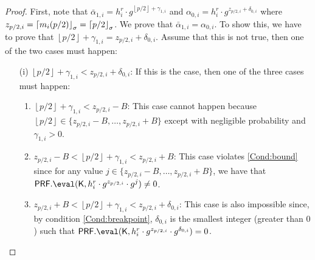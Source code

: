 \begin{proof}

First, note that $\bar \alpha_{1,i}=h_i^r\cdot g^{\left\lfloor p/2\right\rfloor + \gamma_{1,i}}$ and $\alpha_{0,i}=h_i^r\cdot g^{z_{p/2,i}+ \delta_{0,i}} $ where $z_{p/2,i}=\left\lceil m_i(p/2)\right\rfloor_\sigma=\left\lceil p/2 \right\rfloor_{\sigma}$. We prove that $\bar \alpha_{1,i}=\alpha_{0,i}$. To show this, we have to prove that $\left\lfloor p/2\right\rfloor + \gamma_{1,i} =  z_{p/2,i}  + \delta_{0,i}$. Assume that this is not true, then one of the two cases must happen:
\begin{enumerate}
    \item[(i)] $\left\lfloor p/2\right\rfloor + \gamma_{1,i} <  z_{p/2,i}  + \delta_{0,i}$: If this is the case, then one of the three cases must happen:
    \begin{enumerate}
        \item $\left\lfloor p/2\right\rfloor + \gamma_{1,i}< z_{p/2,i}  - B$: This case cannot happen because $\left\lfloor p/2\right\rfloor\in \{z_{p/2,i}- B,\dots, z_{p/2,i} + B \}$ except with negligible probability and $\gamma_{1,i}>0$.
        \item $ z_{p/2,i}  -B<\left\lfloor p/2\right\rfloor + \gamma_{1,i}< z_{p/2,i}  + B$: This case violates \ref{Cond:bound} since for any value $j\in \{z_{p/2,i} - B,\dots, z_{p/2,i} + B \}$, we have that $\PRF.\eval(\key,h_i^r\cdot g^{z_{p/2,i}}\cdot  g^j)\neq 0$.
        \item $ z_{p/2,i}  + B<\left\lfloor p/2\right\rfloor + \gamma_{1,i}< z_{p/2,i}  +\delta_{0,i}$: This case is also impossible since, by condition \ref{Cond:breakpoint}, $\delta_{0,i}$ is the smallest integer (greater than $0$) such that $\PRF.\eval(\key,h_i^r \cdot g^{z_{p/2,i}}\cdot g^{\delta_{0,i}})= 0$.
    \end{enumerate}
    
    
    

\end{enumerate}
\end{proof}
